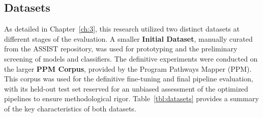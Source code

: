 \subsection{Datasets}\label{ch:4.1.2}
As detailed in Chapter~\ref{ch:3}, this research utilized two distinct datasets at different stages of the evaluation. A smaller \textbf{Initial Dataset}, manually curated from the ASSIST repository, was used for prototyping and the preliminary screening of models and classifiers. The definitive experiments were conducted on the larger \textbf{PPM Corpus}, provided by the Program Pathways Mapper (PPM). This corpus was used for the definitive fine-tuning and final pipeline evaluation, with its held-out test set reserved for an unbiased assessment of the optimized pipelines to ensure methodological rigor. Table~\ref{tbl:datasets} provides a summary of the key characteristics of both datasets.

\begin{table}[!tb]
    \captionsetup{skip=5pt}
    \centering
    \caption{Summary of Datasets Used in Evaluation}
    \label{tbl:datasets}
\end{table}

